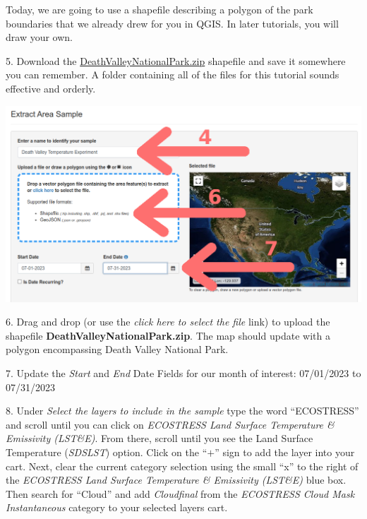 \documentclass[oneside,a4paper,11pt,explicit]{book}
\begin{document}
Today, we are going to use a shapefile describing a polygon of the park boundaries that we already drew for you in QGIS. In later tutorials, you will draw your own.

\vspace{1em}

5. Download the \href{https://jeremydforsythe.github.io/icecream-tutorials/Tutorial2_AccessingRemoteSensingDataWithAppears/DeathValleyNationalPark.zip}{DeathValleyNationalPark.zip} shapefile and save it somewhere you can remember. A folder containing all of the files for this tutorial sounds effective and orderly. 

\centerline{\includegraphics[width=\textwidth]{ExtractDeathValley.png}}

6. Drag and drop (or use the \textit{click here to select the file} link) to upload the shapefile \textbf{DeathValleyNationalPark.zip}. The map should update with a polygon encompassing Death Valley National Park.

7. Update the \textit{Start} and \textit{End} Date Fields for our month of interest: 07/01/2023 to 07/31/2023


8. Under \textit{Select the layers to include in the sample} type the word ``ECOSTRESS'' and scroll until you can click on \textit{ECOSTRESS Land Surface Temperature \& Emissivity (LST\&E)}. From there, scroll until you see the Land Surface Temperature (\textit{SDS\textunderscore LST}) option. Click on the ``$+$'' sign to add the layer into your cart. Next, clear the current category selection using the small ``x'' to the right of the \textit{ECOSTRESS Land Surface Temperature \& Emissivity (LST\&E)} blue box. Then search for ``Cloud'' and add \textit{Cloud\textunderscore final} from the \textit{ECOSTRESS Cloud Mask Instantaneous} category to your selected layers cart.
\end{document}
